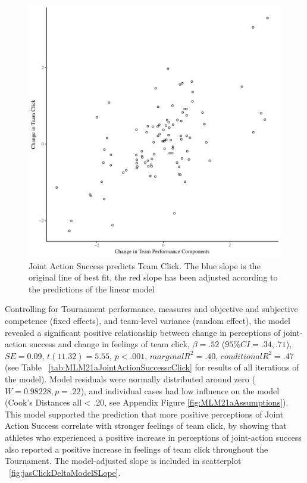 \begin{landscape}
\begin{figure}[htbp]
\includegraphics[width = \linewidth]{images/jasClickDeltaBasicXY}
  \caption{Joint Action Success predicts Team Click. The blue slope is the original line of best fit, the red slope has been adjusted according to the predictions of the linear model}
  \label{fig:jasClickDeltaBasicXY}
\end{figure}

Controlling for Tournament performance, measures and objective and subjective competence (fixed effects), and team-level variance (random effect), the model revealed a significant positive relationship between change in perceptions of joint-action success and change in feelings of team click, $\beta = .52$ ($95\% CI =  .34, .71$), $SE = 0.09$, $t(11.32) = 5.55$, $p < .001$, $marginal R^2 = .40$, $conditional R^2 = .47$ (see Table ~\ref{tab:MLM21aJointActionSuccesscClick} for results of all iterations of the model).  Model residuals were normally distributed around zero ($W = 0.98228, p = .22$), and individual cases had low influence on the model (Cook's Distances all < .20, see Appendix Figure \ref{fig:MLM21aAssumptions}).  This model supported the prediction that more positive perceptions of Joint Action Success correlate with stronger feelings of team click, by showing that athletes who experienced a positive increase in perceptions of joint-action success also reported a positive increase in feelings of team click throughout the Tournament.
The model-adjusted slope is included in scatterplot ~\ref{fig:jasClickDeltaModelSLope}.


\end{landscape}
